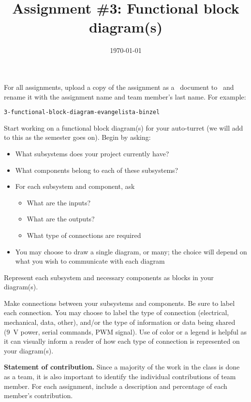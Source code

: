 \documentclass[noanswers]{exam}
\title{Assignment \#3: Functional block diagram(s)}
\author{\usnaAuthorShort}
\date{\today}
\begin{document}
\maketitle

For all assignments, upload a copy of the assignment as a \Google\ document to \GoogleClassroom\ and rename it with the assignment name and team member’s last name.  For example:
\begin{lstlisting}
3-functional-block-diagram-evangelista-binzel
\end{lstlisting}



\begin{questions}
\question
Start working on a functional block diagram(s) for your auto-turret (we will add to this as the semester goes on). Begin by asking:
\begin{itemize}
\item What subsystems does your project currently have?
\item What components belong to each of these subsystems?
\item For each subsystem and component, ask
\begin{itemize}
\item What are the inputs?
\item What are the outputs?
\item What type of connections are required
\end{itemize}
\item You may choose to draw a single diagram, or many; the choice will depend on what you wish to communicate with each diagram
\end{itemize}

\question 
Represent each subsystem and necessary components as blocks in your diagram(s).%

\question
Make connections between your subsystems and components.  Be sure to label each connection. You may choose to label the type of connection (electrical, mechanical, data, other), and/or the type of information or data being shared (\SI{9}{\volt} power, serial commands, PWM signal). Use of color or a legend is helpful as it can visually inform a reader of how each type of connection is represented on your diagram(s). 

\question
\textbf{Statement of contribution.} Since a majority of the work in the class is done as a team, it is also important to identify the individual contributions of team member.  For each assignment, include a description and percentage of each member’s contribution.
\end{questions}
\end{document}
